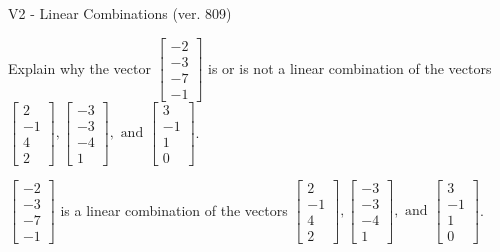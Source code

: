 \begin{exercise}
  \begin{exerciseTitle}V2 - Linear Combinations (ver. 809)\end{exerciseTitle}
  \begin{exerciseStatement}
    Explain why the vector \(\left[\begin{array}{c}
-2 \\
-3 \\
-7 \\
-1
\end{array}\right]\)  is or is not a linear 
	combination of the vectors \(\left[\begin{array}{c}
2 \\
-1 \\
4 \\
2
\end{array}\right] , \left[\begin{array}{c}
-3 \\
-3 \\
-4 \\
1
\end{array}\right] , \text{ and } \left[\begin{array}{c}
3 \\
-1 \\
1 \\
0
\end{array}\right]\).
	


  \end{exerciseStatement}
  \begin{exerciseAnswer}
   \(\left[\begin{array}{c}
-2 \\
-3 \\
-7 \\
-1
\end{array}\right]\) 
  	 is  
	a linear combination of the vectors \(\left[\begin{array}{c}
2 \\
-1 \\
4 \\
2
\end{array}\right] , \left[\begin{array}{c}
-3 \\
-3 \\
-4 \\
1
\end{array}\right] , \text{ and } \left[\begin{array}{c}
3 \\
-1 \\
1 \\
0
\end{array}\right]\).

	
  


  \end{exerciseAnswer}
\end{exercise}